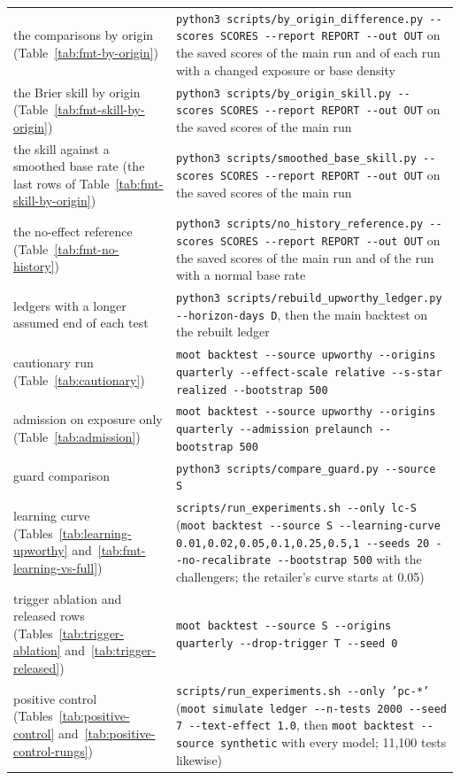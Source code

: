 \begin{table}[t]
{\begin{tabular}{ll}
the comparisons by origin (Table~\ref{tab:fmt-by-origin}) & \texttt{python3 scripts/by\_origin\_difference.py -{}-scores SCORES -{}-report REPORT -{}-out OUT} on the saved scores of the main run and of each run with a changed exposure or base density \\
the Brier skill by origin (Table~\ref{tab:fmt-skill-by-origin}) & \texttt{python3 scripts/by\_origin\_skill.py -{}-scores SCORES -{}-report REPORT -{}-out OUT} on the saved scores of the main run \\
the skill against a smoothed base rate (the last rows of Table~\ref{tab:fmt-skill-by-origin}) & \texttt{python3 scripts/smoothed\_base\_skill.py -{}-scores SCORES -{}-report REPORT -{}-out OUT} on the saved scores of the main run \\
the no-effect reference (Table~\ref{tab:fmt-no-history}) & \texttt{python3 scripts/no\_history\_reference.py -{}-scores SCORES -{}-report REPORT -{}-out OUT} on the saved scores of the main run and of the run with a normal base rate \\
ledgers with a longer assumed end of each test & \texttt{python3 scripts/rebuild\_upworthy\_ledger.py -{}-horizon-days D}, then the main backtest on the rebuilt ledger \\
cautionary run (Table~\ref{tab:cautionary}) & \texttt{moot backtest -{}-source upworthy -{}-origins quarterly -{}-effect-scale relative -{}-s-star realized -{}-bootstrap 500} \\
admission on exposure only (Table~\ref{tab:admission}) & \texttt{moot backtest -{}-source upworthy -{}-origins quarterly -{}-admission prelaunch -{}-bootstrap 500} \\
guard comparison & \texttt{python3 scripts/compare\_guard.py -{}-source S} \\
learning curve (Tables~\ref{tab:learning-upworthy} and~\ref{tab:fmt-learning-vs-full}) & \texttt{scripts/run\_experiments.sh -{}-only lc-S} (\texttt{moot backtest -{}-source S -{}-learning-curve 0.01,0.02,0.05,0.1,0.25,0.5,1 -{}-seeds 20 -{}-no-recalibrate -{}-bootstrap 500} with the challengers; the retailer's curve starts at 0.05) \\
trigger ablation and released rows (Tables~\ref{tab:trigger-ablation} and~\ref{tab:trigger-released}) & \texttt{moot backtest -{}-source S -{}-origins quarterly -{}-drop-trigger T -{}-seed 0} \\
positive control (Tables~\ref{tab:positive-control} and~\ref{tab:positive-control-rungs}) & \texttt{scripts/run\_experiments.sh -{}-only 'pc-*'} (\texttt{moot simulate ledger -{}-n-tests 2000 -{}-seed 7 -{}-text-effect 1.0}, then \texttt{moot backtest -{}-source synthetic} with every model; 11,100 tests likewise) \\

\end{tabular}}
\end{table}
